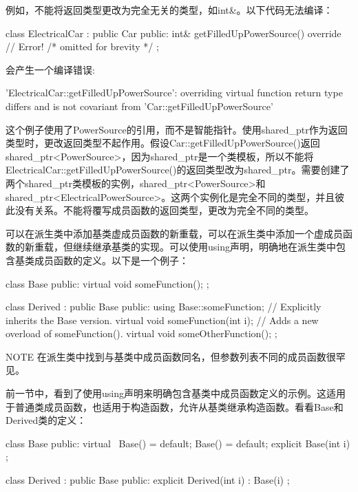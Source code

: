 例如，不能将返回类型更改为完全无关的类型，如int\&。以下代码无法编译：

\begin{cpp}
class ElectricalCar : public Car
{
    public:
        int& getFilledUpPowerSource() override // Error!
        { /* omitted for brevity */ }
};
\end{cpp}

会产生一个编译错误:

\begin{shell}
'ElectricalCar::getFilledUpPowerSource': overriding virtual function return type
differs and is not covariant from 'Car::getFilledUpPowerSource'
\end{shell}

这个例子使用了PowerSource的引用，而不是智能指针。使用shared\_ptr作为返回类型时，更改返回类型不起作用。假设Car::getFilledUpPowerSource()返回shared\_ptr<PowerSource>，因为shared\_ptr是一个类模板，所以不能将ElectricalCar::getFilledUpPowerSource()的返回类型改为shared\_ptr。需要创建了两个shared\_ptr类模板的实例，shared\_ptr<PowerSource>和shared\_ptr<ElectricalPowerSource>。这两个实例化是完全不同的类型，并且彼此没有关系。不能将覆写成员函数的返回类型，更改为完全不同的类型。


可以在派生类中添加基类虚成员函数的新重载，可以在派生类中添加一个虚成员函数的新重载，但继续继承基类的实现。可以使用using声明，明确地在派生类中包含基类成员函数的定义。以下是一个例子：

\begin{cpp}
class Base
{
    public:
        virtual void someFunction();
};

class Derived : public Base
{
    public:
        using Base::someFunction; // Explicitly inherits the Base version.
        virtual void someFunction(int i); // Adds a new overload of someFunction().
        virtual void someOtherFunction();
};
\end{cpp}

\begin{myNotic}{NOTE}
在派生类中找到与基类中成员函数同名，但参数列表不同的成员函数很罕见。
\end{myNotic}


前一节中，看到了使用using声明来明确包含基类中成员函数定义的示例。这适用于普通类成员函数，也适用于构造函数，允许从基类继承构造函数。看看Base和Derived类的定义：

\begin{cpp}
class Base
{
    public:
        virtual ~Base() = default;
        Base() = default;
        explicit Base(int i) {}
};

class Derived : public Base
{
    public:
        explicit Derived(int i) : Base(i) {}
};
\end{cpp}


